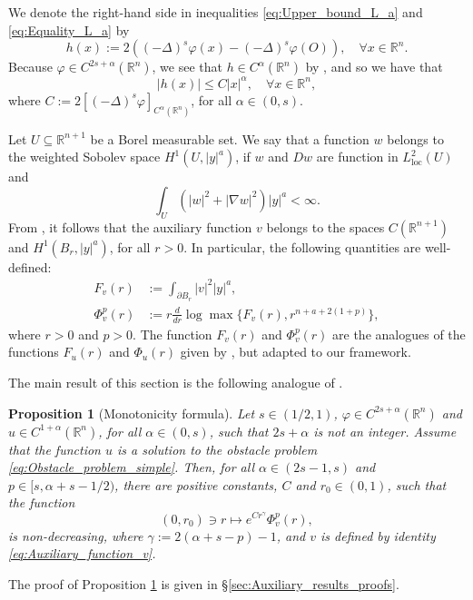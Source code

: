 \documentclass[11pt,reqno]{amsart}
\newtheorem{prop}[thm]{Proposition}
\theoremstyle{definition}
\theoremstyle{remark}
\begin{document}
We denote the right-hand side in inequalities \eqref{eq:Upper_bound_L_a} and \eqref{eq:Equality_L_a} by
\begin{equation}
\label{eq:Definition_h}
h(x):=2\left((-\Delta)^s \varphi(x)-(-\Delta)^s \varphi(O)\right),\quad\forall x\in {\mathbb{R}}^n.
\end{equation}
Because $\varphi\in C^{2s+\alpha}({\mathbb{R}}^n)$, we see that $h \in C^{\alpha}({\mathbb{R}}^n)$ by \cite[Proposition 2.6]{Silvestre_2007}, and so we have that
\begin{equation}
\label{eq:Growth_h}
|h(x)| \leq C|x|^{\alpha},\quad \forall x\in {\mathbb{R}}^n,
\end{equation}
where $C:=2[(-\Delta)^s \varphi]_{C^{\alpha}({\mathbb{R}}^n)}$, for all $\alpha\in (0,s)$.

Let $U\subseteq{\mathbb{R}}^{n+1}$ be a Borel measurable set. We say that a function $w$ belongs to the weighted Sobolev space $H^1(U,|y|^a)$, if $w$ and $Dw$ are function in $L^2_{\operatorname{loc}}(U)$ and
$$
\int_{U}\left(|w|^2+|\nabla w|^2\right)|y|^a <\infty.
$$
From \cite[\S 2.4]{Caffarelli_Silvestre_2007}, it follows that the auxiliary function $v$ belongs to the spaces $C({\mathbb{R}}^{n+1})$ and $ H^1(B_r,|y|^a)$, for all $r>0$. In particular, the following quantities are well-defined:
\begin{align}
\label{eq:F}
F_v(r)&:=\int_{\partial B_r} |v|^2 |y|^a,\\
\label{eq:Phi}
\Phi^p_v(r) &:= r\frac{d}{dr} \log\max\{F_v(r), r^{n+a+2(1+p)}\},
\end{align}
where $r>0$ and $p>0$. The function $F_v(r)$ and $\Phi^p_v(r)$ are the analogues of the functions $F_u(r)$ and $\Phi_u(r)$ given by \cite[Definitions (3.1) and (3.2)]{Caffarelli_Salsa_Silvestre_2008}, but adapted to our framework. 

The main result of this section is the following analogue of \cite[Theorem 3.1]{Caffarelli_Salsa_Silvestre_2008}.

\begin{prop}[Monotonicity formula]
\label{prop:Monotonicity_formula}
Let $s\in (1/2,1)$, $\varphi\in C^{2s+\alpha}({\mathbb{R}}^n)$ and $u\in C^{1+\alpha}({\mathbb{R}}^n)$, for all $\alpha\in (0,s)$, such that $2s+\alpha$ is not an integer. Assume that the function $u$ is a solution to the obstacle problem \eqref{eq:Obstacle_problem_simple}. Then, for all $\alpha\in (2s-1,s)$ and $p\in [s,\alpha+s-1/2)$, there are positive constants, $C$ and $r_0\in (0,1)$, such that the function
\begin{equation}
\label{eq:Monotonicity_formula}
(0,r_0)\ni r\mapsto e^{Cr^{\gamma}} \Phi^p_v(r),
\end{equation}
is non-decreasing, where $\gamma:=2(\alpha+s-p)-1$, and $v$ is defined by identity \eqref{eq:Auxiliary_function_v}.
\end{prop}
The proof of Proposition \ref{prop:Monotonicity_formula} is given in \S \ref{sec:Auxiliary_results_proofs}.
\end{document}
